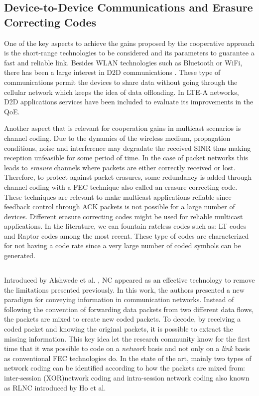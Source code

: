 \subsection{Device-to-Device Communications and Erasure Correcting Codes}
One of the key aspects to achieve the gains proposed by the cooperative approach is the short-range technologies to be considered and its parameters to guarantee a fast and reliable link. Besides \ac{WLAN} technologies such as Bluetooth or \ac{WiFi}, there has been a large interest in \ac{D2D} communications \cite{lin2013comprehensive,asadi2014survey,feng2014device,tehrani2014device}. These type of communications permit the devices to share data without going through the cellular network which keeps the idea of data offloading. In \ac{LTE-A} networks, \ac{D2D} applications services have been included \cite{3gpp2012prose} to evaluate its improvements in the \ac{QoE}.

Another aspect that is relevant for cooperation gains in multicast scenarios is channel coding. Due to the dynamics of the wireless medium, propagation conditions, noise and interference may degradate the received \ac{SINR} thus making reception unfeasible for some period of time. In the case of packet networks this leads to \textit{erasure} channels where packets are either correctly received or lost. Therefore, to protect against packet erasures, some redundancy is added through channel coding with a \ac{FEC} technique also called an erasure correcting code. These techniques are relevant to make multicast applications reliable since feedback control through \ac{ACK} packets is not possible for a large number of devices. Different erasure correcting codes might be used for reliable multicast applications. In the literature, we can fountain rateless codes such as: LT codes and Raptor codes among the most recent. These type of codes are characterized for not having a code rate since a very large number of coded symbols can be generated.    

\subsection{}
Introduced by Alshwede et al. \cite{ahlswede2000network}, \ac{NC} appeared as an effective technology to remove the limitations presented previously. In this work, the authors presented a new paradigm for conveying information in communication networks. Instead of following the convention of forwarding data packets from two different data flows, the packets are mixed to create new coded packets. To decode, by receiving a coded packet and knowing the original packets, it is possible to extract the missing information. This key idea let the research community know for the first time that it was possible to code on a \textit{network} basis and not only on a \textit{link} basis as conventional \ac{FEC} technologies do. In the state of the art, mainly two types of network coding can be identified according to how the packets are mixed from: inter-session (XOR)network coding and intra-session network coding also known as \ac{RLNC} \cite{ho2006random} introduced by Ho et al. 

